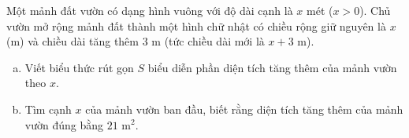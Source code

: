 \begin{bt}%
Một mảnh đất vườn có dạng hình vuông với độ dài cạnh là $x$ mét ($x > 0$). Chủ vườn mở rộng mảnh đất thành một hình chữ nhật có chiều rộng giữ nguyên là $x$ (m) và chiều dài tăng thêm $3\text{ m}$ (tức chiều dài mới là $x + 3\text{ m}$).
\begin{enumerate}[a)]
    \item Viết biểu thức rút gọn $S$ biểu diễn phần diện tích tăng thêm của mảnh vườn theo $x$.
    \item Tìm cạnh $x$ của mảnh vườn ban đầu, biết rằng diện tích tăng thêm của mảnh vườn đúng bằng $21\text{ m}^2$.
\end{enumerate}
\end{bt}

